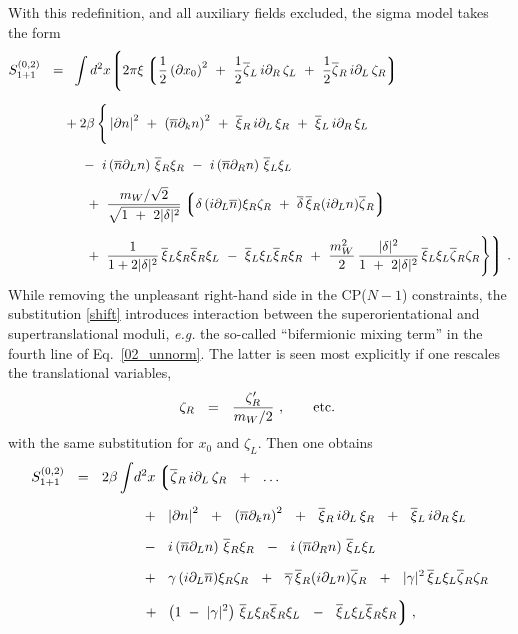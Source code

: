 \documentclass[12pt]{article}
\newcommand{\p}{\partial}
\newcommand{\ov}{\overline}
\newcommand{\lgr}{\left\lgroup}
\newcommand{\rgr}{\right\rgroup}
\newcommand{\bxir}{\ov{\xi}{}_R}
\newcommand{\bxil}{\ov{\xi}{}_L}
\newcommand{\xir}{\xi_R}
\newcommand{\xil}{\xi_L}
\newcommand{\bzl}{\ov{\zeta}{}_L}
\newcommand{\bzr}{\ov{\zeta}{}_R}
\newcommand{\zr}{\zeta_R}
\newcommand{\zl}{\zeta_L}
\newcommand{\nbar}{\ov{n}}
\begin{document}
	With this redefinition, and all auxiliary fields excluded, the sigma model takes the form
\begin{align}
%
\notag
S_{1+1}^{(0,2)} ~~=&~~
	\int d^2 x 
\Biggl\lgroup
	2\pi\xi \lgr \frac 1 2 \left (\p x_0\right)^2 ~+~
		      \frac 1 2 \bzl\, i\p_R\, \zl ~+~
			\frac 1 2 \bzr\, i\p_L\, \zr
		\rgr
	 \\[2mm]
%
\label{02_unnorm}
&
	+2\beta\, \Bigg\{
	\left|\p n\right|^2 ~+~ \left(\ov{n}\p_k n\right)^2 ~+~
	\bxir \, i\p_L \, \xir  ~+~ \bxil \, i\p_R \, \xil \\[2mm]
%
\notag
&
	~~~~
	-~
	i \left(\ov{n}\p_L n\right)\, \bxir \xir ~-~ 
	i \left(\ov{n}\p_R n\right)\, \bxil \xil 
	\\[2mm]
%
\notag
&
	~~~~
	~+~
	\frac{m_W/\sqrt{2}} { \sqrt{ 1~+~2|\delta|^2 } }
	\lgr \delta\, (i\p_L \ov{n}) \xir\zr ~+~ 
             \ov{\delta}\, \bxir (i\p_L n)\bzr 
	\rgr \\[2mm]
%
\notag
&
	~~~~
	~+~ \frac{1}{1 + 2|\delta|^2}\, \bxil\xir \bxir\xil 
	~-~ \bxil\xil\bxir\xir
	~+~
	\frac{m_W^2}{2}\,\frac{|\delta|^2}{1 ~+~ 2|\delta|^2}\,
		\bxil\xil\bzr\zr \Bigg\} 
\Biggr\rgroup~.
\end{align}
	While removing the unpleasant right-hand side in the CP($N-1$) constraints, the
	substitution \eqref{shift} introduces interaction between the superorientational
	and supertranslational moduli, {\it e.g.} the so-called ``bifermionic mixing term''
	in the fourth line of Eq.~\eqref{02_unnorm}.
	The latter is seen most explicitly if one rescales the translational variables,
\[
	\zr ~~=~~ \frac {\zr'}  {{m_W}/{2}}~, \qquad {\rm etc.}~
\]
	with the same substitution for $ x_0 $ and $ \zl $.
	Then one obtains 
\begin{align}
%
\notag
S_{1+1}^{(0,2)} ~~=~~ 2\beta
	\int & d^2 x 
\lgr
	\bzr\, i\p_L\, \zr ~~+~~ \dots 
\right.
	\\[2mm]
%
\label{world02}
	&
	\;\;
	+~~
	\left|\p n\right|^2 ~~+~~ \left(\ov{n}\p_k n\right)^2 ~~+~~
	\bxir \, i\p_L \, \xir  ~~+~~ \bxil \, i\p_R \, \xil 
	\\[2mm]
%
\notag
	&
	\;\;
	-~~
	i \left(\ov{n}\p_L n\right)\, \bxir \xir ~~-~~ 
	i \left(\ov{n}\p_R n\right)\, \bxil \xil  
	\\[2mm]
%
\notag
	&
	\;\;
	+~~
	\gamma\, (i\p_L\nbar) \xir\zr ~~+~~ \ov{\gamma}\, \bxir (i\p_L n) \bzr ~~+~~
	|\gamma|^2\, \bxil\xil \bzr\zr  
	\\[2mm]
%
\notag
	&
	\;\;
\left.
	+~~ 
	\left( 1 \;-\; |\gamma|^2 \right)\, \bxil\xir \bxir\xil  
	~~-~~ \bxil\xil \bxir\xir
\rgr ,
\end{align}
\end{document}
